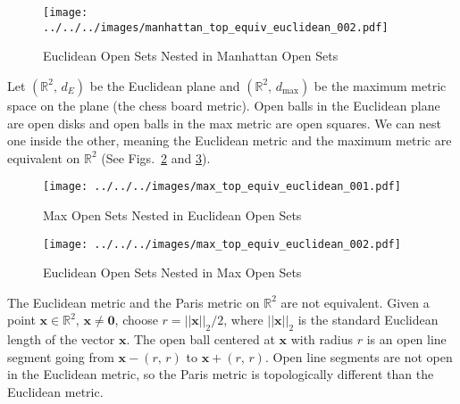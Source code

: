 \documentclass{article}
\theoremstyle{plain}
\theoremstyle{normal}
\newenvironment{example}{%
    \pushQED{\qed}\renewcommand{\qedsymbol}{$\blacksquare$}\examplex%
}{%
    \popQED\endexamplex%
}
\begin{document}
        \begin{figure}
            \centering
            \texttt{[image: ../../../images/manhattan\_top\_equiv\_euclidean\_002.pdf]}
            \caption{Euclidean Open Sets Nested in Manhattan Open Sets}
            \label{fig:manhattan_top_equiv_euclidean_002}
        \end{figure}
        \begin{example}
            Let $(\mathbb{R}^{2},\,d_{E})$ be the Euclidean plane and
            $(\mathbb{R}^{2},\,d_{\textrm{max}})$ be the maximum metric space
            on the plane (the chess board metric). Open balls in the Euclidean
            plane are open disks and open balls in the max metric are open
            squares. We can nest one inside the other, meaning the Euclidean
            metric and the maximum metric are equivalent on $\mathbb{R}^{2}$
            (See Figs.~\ref{fig:max_top_equiv_euclidean_001} and
            \ref{fig:max_top_equiv_euclidean_002}).
        \end{example}
        \begin{figure}
            \centering
            \texttt{[image: ../../../images/max\_top\_equiv\_euclidean\_001.pdf]}
            \caption{Max Open Sets Nested in Euclidean Open Sets}
            \label{fig:max_top_equiv_euclidean_001}
        \end{figure}
        \begin{figure}
            \centering
            \texttt{[image: ../../../images/max\_top\_equiv\_euclidean\_002.pdf]}
            \caption{Euclidean Open Sets Nested in Max Open Sets}
            \label{fig:max_top_equiv_euclidean_002}
        \end{figure}
        \begin{example}
            The Euclidean metric and the Paris metric on
            $\mathbb{R}^{2}$ are not equivalent. Given a point
            $\mathbf{x}\in\mathbb{R}^{2}$, $\mathbf{x}\ne\mathbf{0}$,
            choose $r=||\mathbf{x}||_{2}/2$, where $||\mathbf{x}||_{2}$ is the
            standard Euclidean length of the vector $\mathbf{x}$. The open
            ball centered at $\mathbf{x}$ with radius $r$ is an open
            line segment going from $\mathbf{x}-(r,\,r)$ to
            $\mathbf{x}+(r,\,r)$. Open line segments are not open in the
            Euclidean metric, so the Paris metric is topologically different
            than the Euclidean metric.
        \end{example}
\end{document}
